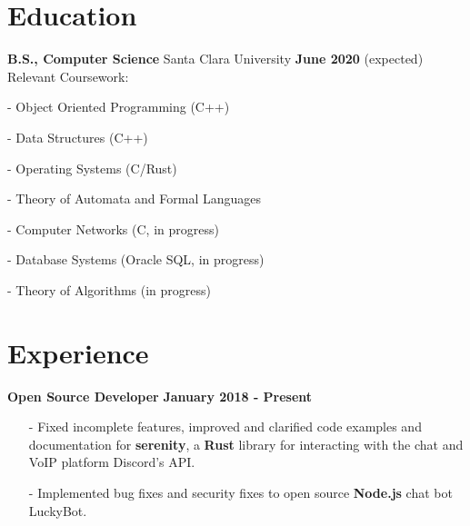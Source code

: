 \documentclass[margin,line]{res}
\begin{document}
\newcommand{\myname}{Derrick Lee}
\newlength{\mynamewidth}
\settowidth{\mynamewidth}{\namefont\myname}

\name{\hspace*{0.5\textwidth}\hspace{-0.5\mynamewidth} \myname \vspace*{.1in}}
\thispagestyle{empty}

\begin{resume}




\section{\sc Education}
{\bf B.S., Computer Science} Santa Clara University \hfill {\bf June 2020} (expected)\\
Relevant Coursework:
\begin{itemize} \itemsep -2pt
  \begin{multicols}{2}
  \item[-] Object Oriented Programming (C++)
  \item[-] Data Structures (C++)
  \item[-] Operating Systems (C/Rust)
  \item[-] Theory of Automata and Formal Languages
  \item[-] Computer Networks (C, in progress)
  \item[-] Database Systems (Oracle SQL, in progress)
  \item[-] Theory of Algorithms (in progress)
  \item[ ] \hfill
  \end{multicols}
\end{itemize}

\section{\sc Experience}
  {\bf Open Source Developer} \hfill {\bf January 2018 - Present} \\
  \vspace{-3.5mm}
  \begin{itemize} \itemsep -2pt
    \item[-] Fixed incomplete features, improved and clarified code examples and documentation for
    {\bf serenity}, a {\bf Rust} library for interacting with the chat and VoIP platform Discord's API. 
    \item[-] Implemented bug fixes and security fixes to open source {\bf Node.js} chat bot LuckyBot.
  \end{itemize}


\end{resume}
\end{document}
